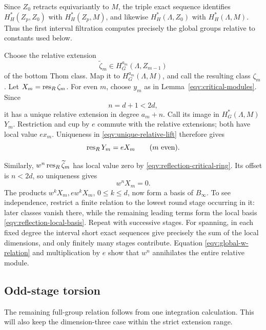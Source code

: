 Since \(Z_0\) retracts equivariantly to \(M\), the triple exact sequence
identifies \(H_H^*(Z_p,Z_0)\) with \(H_H^*(Z_p,M)\), and likewise
\(H_H^*(\Lambda,Z_0)\) with \(H_H^*(\Lambda,M)\).
Thus the first interval filtration computes precisely the global
groups relative to constants used below.

Choose the relative extension
\[
 \widetilde\zeta_m\in H_G^{a_m}(\Lambda,Z_{m-1})
\]
of the bottom Thom class.
Map it to \(H_G^{a_m}(\Lambda,M)\), and call the resulting class
\(\zeta_m\).
Let \(X_m=\operatorname{res}_R\zeta_m\).
For even \(m\), choose \(y_m\) as in
Lemma~\ref{eqv:critical-modules}.
Since
\begin{equation}
 n=d+1<2d,
 \label{eqv:strict-top-gap}
\end{equation}
it has a unique relative extension in degree \(a_m+n\).
Call its image in \(H_G^*(\Lambda,M)\) \(Y_m\).
Restriction and cup by \(e\) commute with the relative extensions;
both have local value \(ex_m\).
Uniqueness in \eqref{eqv:unique-relative-lift} therefore gives
\begin{equation}
 \res_RY_m=eX_m\qquad(m\ \text{even}).
 \label{eqv:even-top-restriction}
\end{equation}

Similarly, \(w^n\operatorname{res}_R\widetilde\zeta_m\) has local value zero
by \eqref{eqv:reflection-critical-ring}.
Its offset is \(n<2d\), so uniqueness gives
\begin{equation}
 w^nX_m=0.
 \label{eqv:global-w-relation}
\end{equation}
The products \(w^kX_m,ew^kX_m\), \(0\le k\le d\), now form a basis
of \(B_\infty\).
To see independence, restrict a finite relation to the lowest round
stage occurring in it: later classes vanish there, while the
remaining leading terms form the local basis
\eqref{eqv:reflection-local-basis}.
Repeat with successive stages.
For spanning, in each fixed degree the interval short exact sequences
give precisely the sum of the local dimensions, and only finitely
many stages contribute.
Equation \eqref{eqv:global-w-relation} and multiplication by \(e\)
show that \(w^n\) annihilates the entire relative module.

\subsection{Odd-stage torsion}

The remaining full-group relation follows from one integration
calculation.  This will also keep the dimension-three case within
the strict extension range.

